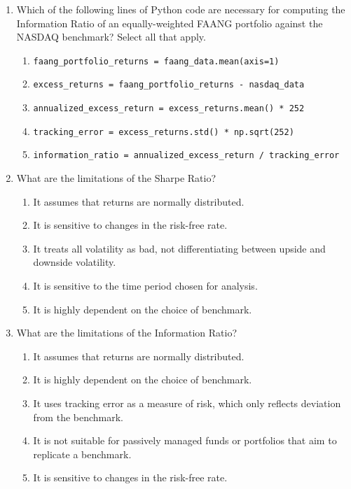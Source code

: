 \documentclass{article}
\begin{document}
\begin{enumerate}
    \item Which of the following lines of Python code are necessary for computing the Information Ratio of an equally-weighted FAANG portfolio against the NASDAQ benchmark? Select all that apply.
    
    \begin{enumerate}
        \item \texttt{faang\_portfolio\_returns = faang\_data.mean(axis=1)}
        \item \texttt{excess\_returns = faang\_portfolio\_returns - nasdaq\_data}
        \item \texttt{annualized\_excess\_return = excess\_returns.mean() * 252}
        \item \texttt{tracking\_error = excess\_returns.std() * np.sqrt(252)}
        \item \texttt{information\_ratio = annualized\_excess\_return / tracking\_error}
    \end{enumerate}

    \item What are the limitations of the Sharpe Ratio?
    \begin{enumerate}
        \item It assumes that returns are normally distributed.
        \item It is sensitive to changes in the risk-free rate.
        \item It treats all volatility as bad, not differentiating between upside and downside volatility.
        \item It is sensitive to the time period chosen for analysis.
        \item It is highly dependent on the choice of benchmark.
    \end{enumerate}

    \item What are the limitations of the Information Ratio?
    \begin{enumerate}
        \item It assumes that returns are normally distributed.
        \item It is highly dependent on the choice of benchmark.
        \item It uses tracking error as a measure of risk, which only reflects deviation from the benchmark.
        \item It is not suitable for passively managed funds or portfolios that aim to replicate a benchmark.
        \item It is sensitive to changes in the risk-free rate.
    \end{enumerate}

\end{enumerate}
\end{document}
